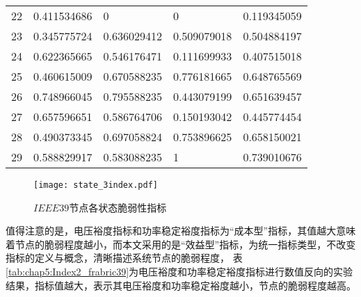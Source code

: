 \begin{table}[H]
\begin{tabular}{C{1.5cm}C{2.5cm}C{2.5cm}C{2.75cm}C{2.75cm}}
  22 & 0.411534686 & 0           & 0           & 0.119345059 \\
  23 & 0.345775724 & 0.636029412 & 0.509079018 & 0.504884197 \\ 
  24 & 0.622365665 & 0.546176471 & 0.111699933 & 0.407515018 \\
  25 & 0.460615009 & 0.670588235 & 0.776181665 & 0.648765569 \\ 
  26 & 0.748966045 & 0.795588235 & 0.443079199 & 0.651639457 \\ 
  27 & 0.657596651 & 0.586764706 & 0.150193042 & 0.445774454 \\ 
  28 & 0.490373345 & 0.697058824 & 0.753896625 & 0.658150021 \\ 
  29 & 0.588829917 & 0.583088235 & 1           & 0.739010676 \\ 
  \bottomrule
  \end{tabular}
\end{table}

\begin{figure}[H] %
  \centering
  \texttt{[image: state\_3index.pdf]}
  \caption{$IEEE39$节点各状态脆弱性指标}
  \label{fig:state_3index}
\end{figure}
值得注意的是，电压裕度指标和功率稳定裕度指标为“成本型”指标，其值越大意味着节点的脆弱程度越小，而本文采用的是“效益型”指标，为统一指标类型，不改变指标的定义与概念，清晰描述系统节点的脆弱程度，
表\ref{tab:chap5:Index2_frabric39}为电压裕度和功率稳定裕度指标进行数值反向的实验结果，指标值越大，表示其电压裕度和功率稳定裕度越小，节点的脆弱程度越高。

